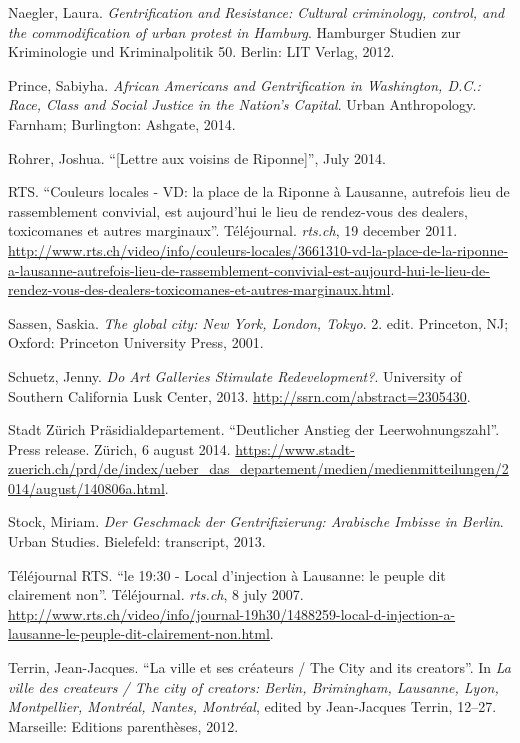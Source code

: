 \documentclass[a4paper,
fontsize=11pt,
oneside,
numbers=noperiodatend,
parskip=half-,
bibliography=totoc,
final
]{scrartcl}
\begin{document}
Naegler, Laura. \emph{Gentrification and Resistance: Cultural
criminology, control, and the commodification of urban protest in
Hamburg}. Hamburger Studien zur Kriminologie und Kriminalpolitik 50.
Berlin: LIT Verlag, 2012.

Prince, Sabiyha. \emph{African Americans and Gentrification in
Washington, D.C.: Race, Class and Social Justice in the Nation's
Capital}. Urban Anthropology. Farnham; Burlington: Ashgate, 2014.

Rohrer, Joshua. \enquote{{[}Lettre aux voisins de Riponne{]}}, July
2014.

RTS. \enquote{Couleurs locales - VD: la place de la Riponne à Lausanne,
autrefois lieu de rassemblement convivial, est aujourd'hui le lieu de
rendez-vous des dealers, toxicomanes et autres marginaux}. Téléjournal.
\emph{rts.ch}, 19 december 2011.
\url{http://www.rts.ch/video/info/couleurs-locales/3661310-vd-la-place-de-la-riponne-a-lausanne-autrefois-lieu-de-rassemblement-convivial-est-aujourd-hui-le-lieu-de-rendez-vous-des-dealers-toxicomanes-et-autres-marginaux.html}.

Sassen, Saskia. \emph{The global city: New York, London, Tokyo}. 2.
edit. Princeton, NJ; Oxford: Princeton University Press, 2001.

Schuetz, Jenny. \emph{Do Art Galleries Stimulate Redevelopment?}.
University of Southern California Lusk Center, 2013.
\url{http://ssrn.com/abstract=2305430}.

Stadt Zürich Präsidialdepartement. \enquote{Deutlicher Anstieg der
Leerwohnungszahl}. Press release. Zürich, 6 august 2014.
\url{https://www.stadt-zuerich.ch/prd/de/index/ueber_das_departement/medien/medienmitteilungen/2014/august/140806a.html}.

Stock, Miriam. \emph{Der Geschmack der Gentrifizierung: Arabische
Imbisse in Berlin}. Urban Studies. Bielefeld: transcript, 2013.

Téléjournal RTS. \enquote{le 19:30 - Local d'injection à Lausanne: le
peuple dit clairement non}. Téléjournal. \emph{rts.ch}, 8 july 2007.
\url{http://www.rts.ch/video/info/journal-19h30/1488259-local-d-injection-a-lausanne-le-peuple-dit-clairement-non.html}.

Terrin, Jean-Jacques. \enquote{La ville et ses créateurs / The City and
its creators}. In \emph{La ville des createurs / The city of creators:
Berlin, Brimingham, Lausanne, Lyon, Montpellier, Montréal, Nantes,
Montréal}, edited by Jean-Jacques Terrin, 12--27. Marseille: Editions
parenthèses, 2012.
\end{document}
